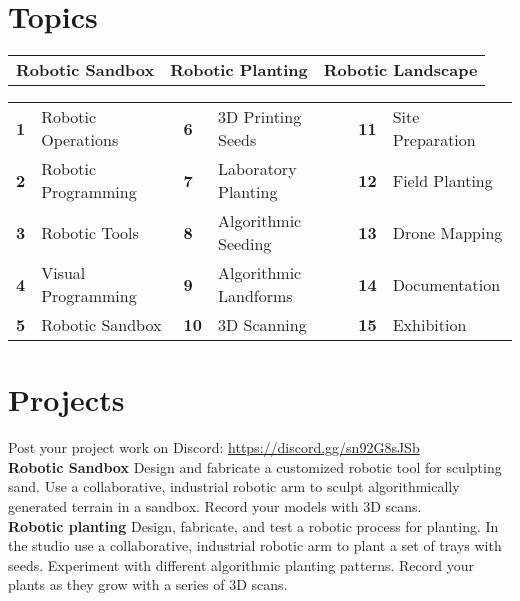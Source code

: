 \documentclass[11pt,article,oneside]{memoir}
\begin{document}
\section{Topics}
%
\begin{table}[H]
\begin{tabular}{l @{\hskip 1.8cm} l @{\hskip 2.3cm} l}
\textbf{Robotic Sandbox} & \textbf{Robotic Planting} & \textbf{Robotic Landscape}\\
\end{tabular}
\end{table}
%
\vspace*{-1em}
%
\begin{table}[H]
\begin{tabular}{l l l l l l}
\small
\textbf{1} & Robotic Operations  & \textbf{6} & 3D Printing Seeds & \textbf{11} & Site Preparation\\
\textbf{2} & Robotic Programming & \textbf{7} & Laboratory Planting & \textbf{12} & Field Planting\\
\textbf{3} &  Robotic Tools & \textbf{8} & Algorithmic Seeding & \textbf{13} & Drone Mapping\\
\textbf{4} & Visual Programming & \textbf{9} & Algorithmic Landforms & \textbf{14} & Documentation\\
\textbf{5} & Robotic Sandbox & \textbf{10} & 3D Scanning & \textbf{15} & Exhibition\\
\end{tabular}
\end{table}

\clearpage

\section{Projects}

Post your project work on Discord: 
\url{https://discord.gg/sn92G8sJSb}\\

\noindent \textbf{Robotic Sandbox}
Design and fabricate a customized robotic tool
for sculpting sand. 
Use a collaborative, industrial robotic arm
to sculpt algorithmically generated terrain
in a sandbox. 
Record your models with 3D scans.
\\

\noindent \textbf{Robotic planting}
Design, fabricate, and test a robotic process for planting.
In the studio use a collaborative, industrial robotic arm
to plant a set of trays with seeds. 
Experiment with different algorithmic planting patterns. 
Record your plants as they grow with a series of 3D scans.
\\
\end{document}
